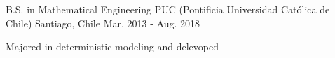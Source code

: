 

\begin{cventries}

  \cventry
    {B.S. in Mathematical Engineering} %
    {PUC (Pontificia Universidad Católica de Chile)} %
    {Santiago, Chile} %
    {Mar. 2013 - Aug. 2018} %
    {
      \begin{cvitems} %
        \item {Majored in deterministic modeling and delevoped }
      \end{cvitems}
    }

\end{cventries}
